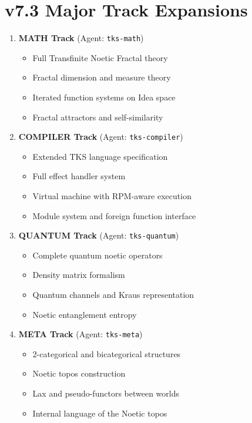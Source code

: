 \documentclass[11pt,twoside,openright]{book}
\theoremstyle{definition}
\theoremstyle{plain}
\theoremstyle{remark}
\begin{document}
\section*{v7.3 Major Track Expansions}

\begin{enumerate}
  \item \textbf{MATH Track} (Agent: \texttt{tks-math})
  \begin{itemize}
    \item Full Transfinite Noetic Fractal theory
    \item Fractal dimension and measure theory
    \item Iterated function systems on Idea space
    \item Fractal attractors and self-similarity
  \end{itemize}

  \item \textbf{COMPILER Track} (Agent: \texttt{tks-compiler})
  \begin{itemize}
    \item Extended TKS language specification
    \item Full effect handler system
    \item Virtual machine with RPM-aware execution
    \item Module system and foreign function interface
  \end{itemize}

  \item \textbf{QUANTUM Track} (Agent: \texttt{tks-quantum})
  \begin{itemize}
    \item Complete quantum noetic operators
    \item Density matrix formalism
    \item Quantum channels and Kraus representation
    \item Noetic entanglement entropy
  \end{itemize}

  \item \textbf{META Track} (Agent: \texttt{tks-meta})
  \begin{itemize}
    \item 2-categorical and bicategorical structures
    \item Noetic topos construction
    \item Lax and pseudo-functors between worlds
    \item Internal language of the Noetic topos
  \end{itemize}
\end{enumerate}
\end{document}
